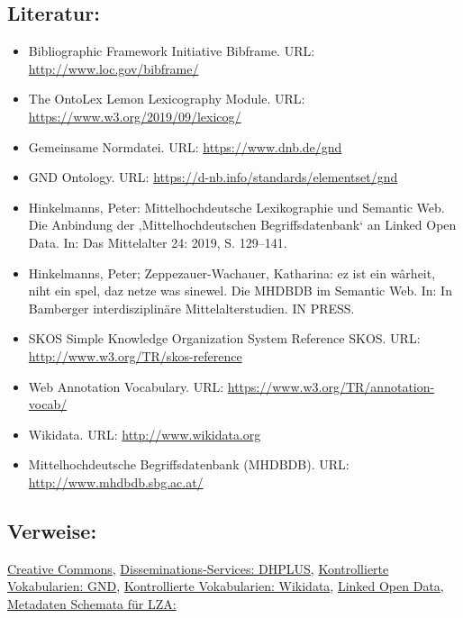 \documentclass{article}
\begin{document}
        \subsection*{Literatur:}\begin{itemize}\item Bibliographic Framework Initiative Bibframe. URL: \url{http://www.loc.gov/bibframe/}\item The OntoLex Lemon Lexicography Module. URL: \url{https://www.w3.org/2019/09/lexicog/}\item Gemeinsame Normdatei. URL: \url{https://www.dnb.de/gnd}\item GND Ontology. URL: \url{https://d-nb.info/standards/elementset/gnd}\item Hinkelmanns, Peter: Mittelhochdeutsche Lexikographie und Semantic Web. Die
                              Anbindung der ‚Mittelhochdeutschen Begriffsdatenbank‘ an Linked Open
                              Data. In: Das Mittelalter 24: 2019, S. 129–141.\item Hinkelmanns, Peter; Zeppezauer-Wachauer, Katharina: ez ist ein wârheit, niht ein spel, daz netze was
                              sinewel. Die MHDBDB im Semantic Web. In: In Bamberger interdisziplinäre Mittelalterstudien. IN
                              PRESS.\item SKOS Simple Knowledge Organization System
                              Reference SKOS. URL: \url{http://www.w3.org/TR/skos-reference}\item Web Annotation Vocabulary. URL: \url{https://www.w3.org/TR/annotation-vocab/}\item Wikidata. URL: \url{http://www.wikidata.org}\item Mittelhochdeutsche Begriffsdatenbank (MHDBDB). URL: \url{http://www.mhdbdb.sbg.ac.at/}\end{itemize}\subsection*{Verweise:}\href{https://gams.uni-graz.at/o:konde.45}{Creative Commons}, \href{https://gams.uni-graz.at/o:konde.68}{Disseminations-Services:
                           DHPLUS}, \href{https://gams.uni-graz.at/o:konde.109}{Kontrollierte Vokabularien:
                           GND}, \href{https://gams.uni-graz.at/o:konde.112}{Kontrollierte Vokabularien:
                           Wikidata}, \href{https://gams.uni-graz.at/o:konde.8}{Linked Open Data}, \href{https://gams.uni-graz.at/o:konde.132}{Metadaten Schemata für LZA:
}
\end{document}
